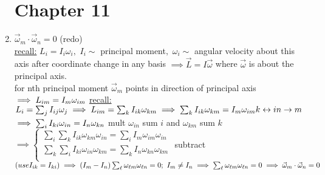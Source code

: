 \documentclass[12pt]{amsart}
\begin{document}
\begin{enumerate}
\section*{Chapter 11}
\item \underline{$\vec{\omega}_m \cdot \vec{\omega}_n = 0$} (redo)\\
\underline{recall:} $L_i = I_i \omega_i ,\,\, I_i \sim$ principal moment$,\,\, \omega_i \sim$ angular velocity about this axis after coordinate change in any basis $\implies \vec{L} = I \vec{\omega}$ where $\vec{\omega}$ is about the principal axis.\\
for nth principal moment $\vec{\omega}_m$ points in direction of principal axis\\
$\implies L_{im} = I_m \omega_{im}\\$
\underline{recall:} $L_i = \sum_j I_{ij} \omega_j\\
\implies L_{im} = \sum_k I_{ik} \omega_{km}\\
\implies \sum_k I_{ik} \omega_{km} = I_m \omega_{im}\\
k \leftrightarrow{} i n \rightarrow m\\$
$\implies \sum_i I_{ki} \omega_{in} = I_n \omega_{kn}\\$
mult $\omega_{in}$ sum $i$ and $\omega_{km}$ sum $k$\\
$\implies 
\begin{cases} \sum_i \sum_k I_{ik} \omega_{km} \omega_{in} = \sum_i I_m \omega_{im} \omega_{in}\\
\sum_k \sum_i I_{ki} \omega_{in} \omega_{km} = \sum_k I_n \omega_{kn} \omega_{km}\\
\end{cases}$
subtract $(use I_{ik} = I_{ki})\\
\implies (I_m - I_n) \sum_{\ell} \omega_{\ell m} \omega_{\ell n} = 0;\,\, I_m \neq I_n\\
\implies \sum_{\ell} \omega_{\ell m} \omega_{\ell n} = 0 \implies \vec{\omega}_m \cdot \vec{\omega}_n=0$


\hdashrule[0.5ex][c]{\linewidth}{0.5pt}{1.5mm}



\end{enumerate}
\end{document}
